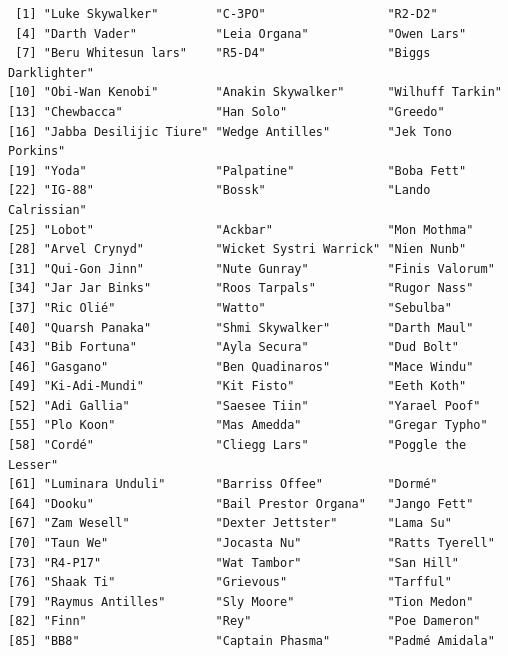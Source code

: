 \documentclass[
  letterpaper,
  DIV=11,
  numbers=noendperiod]{scrartcl}
\newenvironment{Shaded}{\begin{snugshade}}{\end{snugshade}}
\newcommand{\NormalTok}[1]{\textcolor[rgb]{0.00,0.23,0.31}{#1}}
\newcommand{\SpecialCharTok}[1]{\textcolor[rgb]{0.37,0.37,0.37}{#1}}
\newcommand{\StringTok}[1]{\textcolor[rgb]{0.13,0.47,0.30}{#1}}
\begin{document}
\begin{Shaded}
\end{Shaded}

\begin{verbatim}
 [1] "Luke Skywalker"        "C-3PO"                 "R2-D2"                
 [4] "Darth Vader"           "Leia Organa"           "Owen Lars"            
 [7] "Beru Whitesun lars"    "R5-D4"                 "Biggs Darklighter"    
[10] "Obi-Wan Kenobi"        "Anakin Skywalker"      "Wilhuff Tarkin"       
[13] "Chewbacca"             "Han Solo"              "Greedo"               
[16] "Jabba Desilijic Tiure" "Wedge Antilles"        "Jek Tono Porkins"     
[19] "Yoda"                  "Palpatine"             "Boba Fett"            
[22] "IG-88"                 "Bossk"                 "Lando Calrissian"     
[25] "Lobot"                 "Ackbar"                "Mon Mothma"           
[28] "Arvel Crynyd"          "Wicket Systri Warrick" "Nien Nunb"            
[31] "Qui-Gon Jinn"          "Nute Gunray"           "Finis Valorum"        
[34] "Jar Jar Binks"         "Roos Tarpals"          "Rugor Nass"           
[37] "Ric Olié"              "Watto"                 "Sebulba"              
[40] "Quarsh Panaka"         "Shmi Skywalker"        "Darth Maul"           
[43] "Bib Fortuna"           "Ayla Secura"           "Dud Bolt"             
[46] "Gasgano"               "Ben Quadinaros"        "Mace Windu"           
[49] "Ki-Adi-Mundi"          "Kit Fisto"             "Eeth Koth"            
[52] "Adi Gallia"            "Saesee Tiin"           "Yarael Poof"          
[55] "Plo Koon"              "Mas Amedda"            "Gregar Typho"         
[58] "Cordé"                 "Cliegg Lars"           "Poggle the Lesser"    
[61] "Luminara Unduli"       "Barriss Offee"         "Dormé"                
[64] "Dooku"                 "Bail Prestor Organa"   "Jango Fett"           
[67] "Zam Wesell"            "Dexter Jettster"       "Lama Su"              
[70] "Taun We"               "Jocasta Nu"            "Ratts Tyerell"        
[73] "R4-P17"                "Wat Tambor"            "San Hill"             
[76] "Shaak Ti"              "Grievous"              "Tarfful"              
[79] "Raymus Antilles"       "Sly Moore"             "Tion Medon"           
[82] "Finn"                  "Rey"                   "Poe Dameron"          
[85] "BB8"                   "Captain Phasma"        "Padmé Amidala"        
\end{verbatim}
\end{document}
